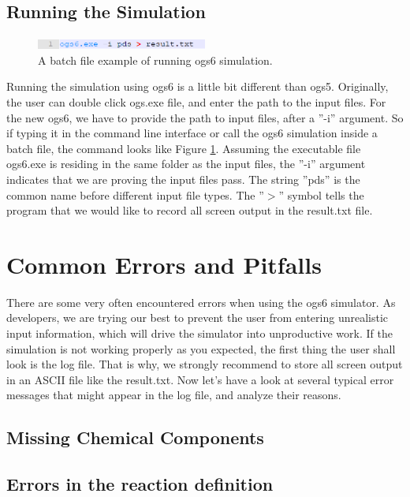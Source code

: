 \subsection{Running the Simulation}

\begin{figure}
\includegraphics[width=0.5\textwidth]{RT/figs/RT_fig_bat_file}
\caption{A batch file example of running ogs6 simulation. }
\label{fig:RT_fig_bat_file}
\end{figure}

Running the simulation using ogs6 is a little bit different than ogs5. Originally, the user can double click ogs.exe file, and enter the path to the input files. For the new ogs6, we have to provide the path to input files, after a ''-i'' argument. So if typing it in the command line interface or call the ogs6 simulation inside a batch file, the command looks like Figure \ref{fig:RT_fig_bat_file}. Assuming the executable file ogs6.exe is residing in the same folder as the input files, the ''-i'' argument indicates that we are proving the input files pass. The string ''pds'' is the common name before different input file types. The ''$>$'' symbol tells the program that we would like to record all screen output in the result.txt file. 

\section{Common Errors and Pitfalls}
\label{sec:common_error}
There are some very often encountered errors when using the ogs6 simulator. As developers, we are trying our best to prevent the user from entering unrealistic input information, which will drive the simulator into unproductive work. If the simulation is not working properly as you expected, the first thing the user shall look is the log file. That is why, we strongly recommend to store all screen output in an ASCII file like the result.txt. Now let’s have a look at several typical error messages that might appear in the log file, and analyze their reasons. 

\subsection{Missing Chemical Components}

\subsection{Errors in the reaction definition}

